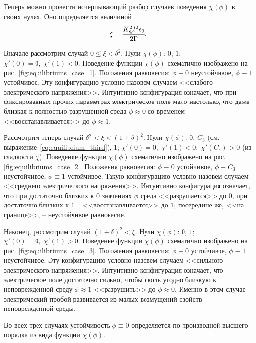 Теперь можно провести исчерпывающий разбор случаев поведения $\chi(\phi)$ в своих нулях. Оно определяется величиной
\begin{equation}
	\xi = \cfrac{K_\Phi^2 l^2 \epsilon_0}{2 \Gamma} {\text{.}}
	\label{char:equilibriums}
\end{equation}

Вначале рассмотрим случай $0 \leqslant \xi < \delta^2$. Нули $\chi(\phi)$: $0$, $1$; $\chi'(0) = 0, \; \chi'(1) < 0$. Поведение функции $\chi(\phi)$ схематично изображено на рис. \ref{fig:equilibriums_case_1}. Положения равновесия: $\phi \equiv 0$ неустойчивое, $\phi \equiv 1$ устойчивое. Эту конфигурацию условно назовем случаем <<слабого электрического напряжения>>. Интуитивно конфигурация означает, что при фиксированных прочих параметрах электрическое поле мало настолько, что даже близкая к полностью разрушенной среда $\phi \approx 0$ со временем <<восстанавливается>> до $\phi \approx 1$.

Рассмотрим теперь случай $\delta^2 < \xi < (1 + \delta)^2$. Нули $\chi(\phi)$: $0$, $C_3$ (см. выражение~\eqref{eq:equilibrium_third}), $1$; $\chi'(0) = 0, \; \chi'(1) < 0; \; \chi'(C_3) > 0$ (из гладкости $\chi$). Поведение функции $\chi(\phi)$ схематично изображено на рис. \ref{fig:equilibriums_case_2}. Положения равновесия: $\phi \equiv 0$ устойчивое, $\phi \equiv C_3$ неустойчивое, $\phi \equiv 1$ устойчивое. Такую конфигурацию условно назовем случаем <<среднего электрического напряжения>>. Интуитивно конфигурация означает, что при достаточно близких к $0$ значениях $\phi$ среда <<разрушается>> до $0$, при достаточно близких к $1$ -- <<восстанавливается>> до $1$; посередине же, <<на границе>>, -- неустойчивое равновесие.

Наконец, рассмотрим случай $(1 + \delta)^2 < \xi$. Нули $\chi(\phi)$: $0$, $1$; $\chi'(0) = 0, \; \chi'(1) > 0$. Поведение функции $\chi(\phi)$ схематично изображено на рис. \ref{fig:equilibriums_case_3}. Положения равновесия: $\phi \equiv 0$ устойчивое, $\phi \equiv 1$ неустойчивое. Эту конфигурацию условно назовем случаем <<сильного электрического напряжения>>. Интуитивно конфигурация означает, что электрическое поле достаточно сильно, чтобы сколь угодно близкую к неповрежденной среду $\phi \approx 1$ <<разрушить>> до $\phi \approx 0$. Именно в этом случае электрический пробой развивается из малых возмущений свойств неповрежденной среды.

Во всех трех случаях устойчивость $\phi \equiv 0$ определяется по производной высшего порядка из вида функции $\chi(\phi)$.


